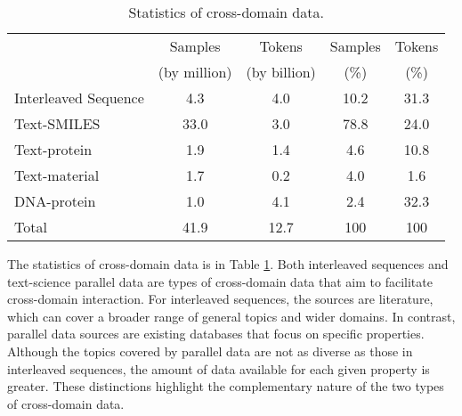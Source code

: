 \begin{table}[!htbp]
\centering
\begin{tabular}{lcccc}
\toprule
& Samples & Tokens & Samples & Tokens \\
& (by million) & (by billion) & (\%) & (\%) \\ 
\midrule
Interleaved Sequence & 4.3 & 4.0 & 10.2 & 31.3 \\
Text-SMILES & 33.0 & 3.0 & 78.8 & 24.0 \\
Text-protein & 1.9 & 1.4 & 4.6 & 10.8\\
Text-material & 1.7 & 0.2 & 4.0 & 1.6 \\
DNA-protein & 1.0 & 4.1 & 2.4 & 32.3 \\
\midrule 
Total& 41.9 & 12.7 & 100 & 100 \\
\bottomrule
\end{tabular}
\caption{Statistics of cross-domain data.}
\label{tab:statistics_multimodal_data}
\end{table}

The statistics of cross-domain data is in Table \ref{tab:statistics_multimodal_data}. Both interleaved sequences and text-science parallel data are types of cross-domain data that aim to facilitate cross-domain interaction. For interleaved sequences, the sources are literature, which can cover a broader range of general topics and wider domains. In contrast, parallel data sources are existing databases that focus on specific properties. Although the topics covered by parallel data are not as diverse as those in interleaved sequences, the amount of data available for each given property is greater. These distinctions highlight the complementary nature of the two types of cross-domain data.



